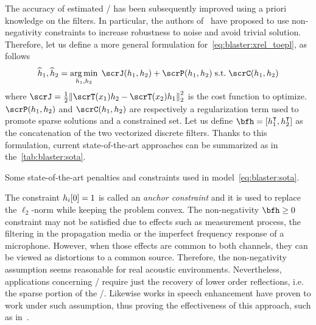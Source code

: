 \mynewline
The accuracy of estimated \RIRs/ has been subsequently improved using a priori knowledge on the filters.
In particular, the authors of~ have proposed to use non-negativity constraints to increase robustness to noise and avoid trivial solution.
Therefore, let us define a more general formulation for~\cref{eq:blaster:xrel_toepl}, as follows
\begin{equation}\label{eq:blaster:sota}
    \disFilterHat_1, \disFilterHat_2
    =
    \kargmin_{\disFilter_1, \disFilter_2}
    \;
    \scrJ(\disFilter_1, \disFilter_2) + \scrP(\disFilter_1, \disFilter_2)
    \;\text{s.t.}\;
    \scrC(\disFilter_1, \disFilter_2)
\end{equation}
where $\scrJ = \tfrac{1}{2} \kvvbar{\scrT(\disRecordedSignal_1) \disFilter_2 - \scrT(\disRecordedSignal_2) \disFilter_1}_2^2$ is the cost function to optimize.
$\scrP(\disFilter_1, \disFilter_2)$ and $\scrC(\disFilter_1, \disFilter_2)$ are respectively a regularization term used to promote sparse solutions and a constrained set.
Let us define $\bfh = \klist{h_1^\intercal, h_2^\intercal}$ as the concatenation of the two vectorized discrete filters.
Thanks to this formulation, current state-of-the-art approaches can be summarized as in the~\cref{tab:blaster:sota}.

\begin{table}[!h]

    \begin{fullwidth}
        \centering
        \small
        

        \caption{Some state-of-the-art penalties and constraints used in model~\cref{eq:blaster:sota}.}
        \label{tab:blaster:sota}
    \end{fullwidth}
\end{table}

\mynewline
The constraint $h_i[0]=1$ is called an \textit{anchor constraint} and it is used to replace the $\ell_2$-norm while keeping the problem convex.
The non-negativity $\bfh \geq 0$ constraint may not be satisfied due to effects such as measurement process, the filtering in the propagation media or the imperfect frequency response of a microphone.
However, when those effects are common to both channels, they can be viewed as distortions to a common source.
Therefore, the non-negativity assumption seems reasonable for real acoustic environments.
Nevertheless, applications concerning \RooGE/ require just the recovery of lower order reflections, i.e. the sparse portion of the \RIR/.
Likewise works in speech enhancement have proven to work under such assumption, thus proving the effectiveness of this approach, such as in~.

